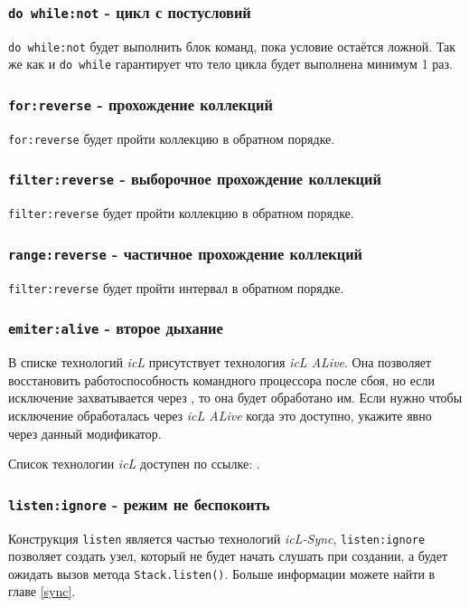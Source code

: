 \subsubsection{\lstinline|do while:not| - цикл с постусловий}

\lstinline|do while:not| будет выполнить блок команд, пока условие остаётся ложной. Так же как и \lstinline|do while| гарантирует что тело цикла будет выполнена минимум 1 раз.

\subsubsection{\lstinline|for:reverse| - прохождение коллекций}

\lstinline|for:reverse| будет пройти коллекцию в обратном порядке.

\subsubsection{\lstinline|filter:reverse| - выборочное прохождение коллекций}

\lstinline|filter:reverse| будет пройти коллекцию в обратном порядке.

\subsubsection{\lstinline|range:reverse| - частичное прохождение коллекций}

\lstinline|filter:reverse| будет пройти интервал в обратном порядке.

\subsubsection{\lstinline|emiter:alive| - второе дыхание}

В списке технологий \textit{icL} присутствует технология \textit{icL ALive}. Она позволяет восстановить работоспособность командного процессора после сбоя, но если исключение захватывается через , то она будет обработано им. Если нужно чтобы исключение обработалась через \textit{icL ALive} когда это доступно, укажите явно через данный модификатор.

Список технологии \textit{icL} доступен по ссылке: .

\subsubsection{\lstinline|listen:ignore| - режим не беспокоить}

Конструкция \lstinline|listen| является частью технологий \textit{icL-Sync}, \lstinline|listen:ignore| позволяет создать узел, который не будет начать слушать при создании, а будет ожидать вызов метода \lstinline|Stack.listen()|. Больше информации можете найти в главе \ref{sync}. 
